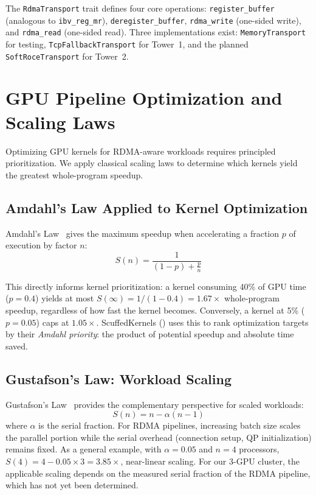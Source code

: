 \documentclass[11pt,letterpaper]{article}
\theoremstyle{definition}
\begin{document}
The \texttt{RdmaTransport} trait defines four core operations: \texttt{register\_buffer} (analogous to \texttt{ibv\_reg\_mr}), \texttt{deregister\_buffer}, \texttt{rdma\_write} (one-sided write), and \texttt{rdma\_read} (one-sided read). Three implementations exist: \texttt{MemoryTransport} for testing, \texttt{TcpFallbackTransport} for Tower~1, and the planned \texttt{SoftRoceTransport} for Tower~2.

\section{GPU Pipeline Optimization and Scaling Laws}
\label{sec:scaling-laws}

Optimizing GPU kernels for RDMA-aware workloads requires principled prioritization. We apply classical scaling laws to determine which kernels yield the greatest whole-program speedup.

\subsection{Amdahl's Law Applied to Kernel Optimization}

Amdahl's Law~\cite{amdahl1967} gives the maximum speedup when accelerating a fraction $p$ of execution by factor $n$:
\begin{equation}
\label{eq:amdahl}
    S(n) = \frac{1}{(1-p) + \frac{p}{n}}
\end{equation}

This directly informs kernel prioritization: a kernel consuming 40\% of GPU time ($p=0.4$) yields at most $S(\infty) = 1/(1-0.4) = 1.67\times$ whole-program speedup, regardless of how fast the kernel becomes. Conversely, a kernel at 5\% ($p=0.05$) caps at $1.05\times$. ScuffedKernels () uses this to rank optimization targets by their \emph{Amdahl priority}: the product of potential speedup and absolute time saved.

\subsection{Gustafson's Law: Workload Scaling}

Gustafson's Law~\cite{gustafson1988} provides the complementary perspective for scaled workloads:
\begin{equation}
\label{eq:gustafson}
    S(n) = n - \alpha(n-1)
\end{equation}
where $\alpha$ is the serial fraction. For RDMA pipelines, increasing batch size scales the parallel portion while the serial overhead (connection setup, QP initialization) remains fixed. As a general example, with $\alpha = 0.05$ and $n = 4$ processors, $S(4) = 4 - 0.05 \times 3 = 3.85\times$, near-linear scaling. For our 3-GPU cluster, the applicable scaling depends on the measured serial fraction of the RDMA pipeline, which has not yet been determined.
\end{document}
